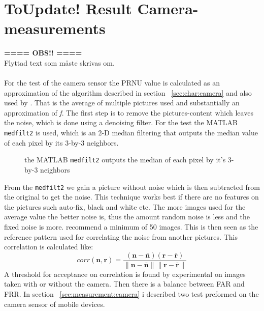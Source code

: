 \section{\textbf{ToUpdate! }Result Camera-measurements}\label{sec:ResCam}
\textbf{ ==== OBS!! ====}\\ Flyttad text som måste skrivas om.\\
\\
For the test of the camera sensor the PRNU value is calculated as an approximation of the algorithm described in section ~\ref{sec:char:camera} and also used by \cite{sensor:camera:DCIdent}. That is the average of multiple pictures used and substantially an approximation of \textit{f}. The first step is to remove the pictures-content which leaves the noise, which is done using a denoising filter. For the test the MATLAB \texttt{medfilt2} is used, which is an 2-D median filtering that outputs the median value of each pixel by its 3-by-3 neighbors. 
\begin{figure}[H]
  \centering
  
  \caption{\label{fig:medfilt2} the MATLAB \texttt{medfilt2} outputs the median of each pixel by it's 3-by-3 neighbors}
\end{figure}
From the \texttt{medfilt2} we gain a picture without noise which is then subtracted from the original to get the noise. This technique works best if there are no features on the pictures such auto-fix, black and white etc. The more images used for the average value the better noise is, thus the amount random noise is less and the fixed noise is more. \cite{sensor:camera:DCIdent} recommend a minimum of 50 images. This is then seen as the reference pattern used for correlating the noise from another pictures. This correlation is calculated like:
$$
corr(\boldsymbol{n},\boldsymbol{r}) = 
\frac{(\boldsymbol{n} - \bar{\boldsymbol{n}})(\boldsymbol{r} - \bar{\boldsymbol{r}})}
{\|\boldsymbol{n} - \bar{\boldsymbol{n}}\| \|\boldsymbol{r} - \bar{\boldsymbol{r}}\|}
$$
A threshold for acceptance on correlation is found by experimental on images taken with or without the camera. Then there is a balance between FAR and FRR. 
In section ~\ref{sec:measurement:camera} i described two test preformed on the camera sensor of mobile devices.
